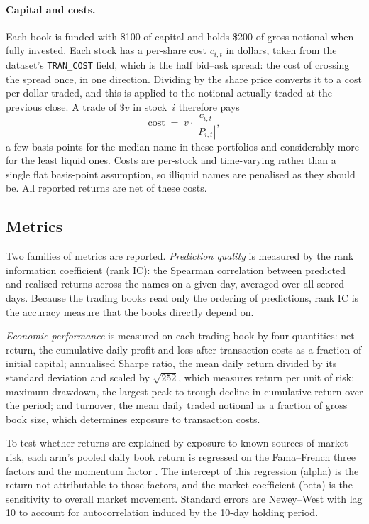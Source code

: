 \paragraph{Capital and costs.} Each book is funded with \$100 of capital
and holds \$200 of gross notional when fully invested. Each stock has a
per-share cost $c_{i,t}$ in dollars, taken from the dataset's
\texttt{TRAN\_COST} field, which is the half bid--ask spread: the cost of
crossing the spread once, in one direction. Dividing by the share price
converts it to a cost per dollar traded, and this is applied to the
notional actually traded at the previous close. A trade of $\$v$ in
stock~$i$ therefore pays
\begin{equation*}
  \text{cost} \;=\; v \cdot \frac{c_{i,t}}{|P_{i,t}|},
\end{equation*}
a few basis points for the median name in these portfolios and
considerably more for the least liquid ones. Costs are per-stock and
time-varying rather than a single flat basis-point assumption, so
illiquid names are penalised as they should be. All reported returns are
net of these costs.

\subsection{Metrics}

Two families of metrics are reported. \emph{Prediction quality} is
measured by the rank information coefficient (rank IC): the Spearman
correlation between predicted and realised returns across the names on
a given day, averaged over all scored days. Because the trading books
read only the ordering of predictions, rank IC is the accuracy measure
that the books directly depend on.

\emph{Economic performance} is measured on each trading book by four
quantities: net return, the cumulative daily profit and loss after
transaction costs as a fraction of initial capital; annualised Sharpe
ratio, the mean daily return divided by its standard deviation and
scaled by $\sqrt{252}$, which measures return per unit of risk; maximum
drawdown, the largest peak-to-trough decline in cumulative return over
the period; and turnover, the mean daily traded notional as a fraction
of gross book size, which determines exposure to transaction costs.

To test whether returns are explained by exposure to known sources of
market risk, each arm's pooled daily book return is regressed on the
Fama--French three factors \cite{fama1993common} and the momentum
factor \cite{carhart1997persistence}. The intercept of this regression
(alpha) is the return not attributable to those factors, and the
market coefficient (beta) is the sensitivity to overall market
movement. Standard errors are Newey--West \cite{newey1986simple} with
lag 10 to account for autocorrelation induced by the 10-day holding
period.

